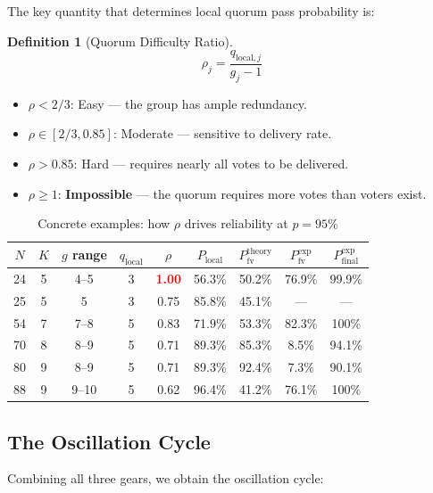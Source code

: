 \documentclass[12pt,a4paper]{article}
\newtheorem{definition}{Definition}
\begin{document}
The key quantity that determines local quorum pass probability is:

\begin{definition}[Quorum Difficulty Ratio]
\begin{equation}
  \rho_j = \frac{q_{\text{local},j}}{g_j - 1}
  \label{eq:rho}
\end{equation}
\end{definition}

\begin{itemize}
  \item $\rho < 2/3$: Easy --- the group has ample redundancy.
  \item $\rho \in [2/3, 0.85]$: Moderate --- sensitive to delivery rate.
  \item $\rho > 0.85$: Hard --- requires nearly all votes to be delivered.
  \item $\rho \geq 1$: \textbf{Impossible} --- the quorum requires more votes than voters exist.
\end{itemize}

\begin{table}[H]
\centering
\caption{Concrete examples: how $\rho$ drives reliability at $p = 95\%$}
\begin{tabular}{ccccccccc}
\toprule
$N$ & $K$ & $g$ range & $q_{\text{local}}$ & $\rho$ & $P_{\text{local}}$ & $P_{\text{fv}}^{\text{theory}}$ & $P_{\text{fv}}^{\text{exp}}$ & $P_{\text{final}}^{\text{exp}}$ \\
\midrule
24 & 5 & 4--5 & 3 & \textcolor{red}{\textbf{1.00}} & 56.3\% & 50.2\% & 76.9\% & 99.9\% \\
25 & 5 & 5 & 3 & 0.75 & 85.8\% & 45.1\% & --- & --- \\
54 & 7 & 7--8 & 5 & 0.83 & 71.9\% & 53.3\% & 82.3\% & 100\% \\
70 & 8 & 8--9 & 5 & 0.71 & 89.3\% & 85.3\% & 8.5\% & 94.1\% \\
80 & 9 & 8--9 & 5 & 0.71 & 89.3\% & 92.4\% & 7.3\% & 90.1\% \\
88 & 9 & 9--10 & 5 & 0.62 & 96.4\% & 41.2\% & 76.1\% & 100\% \\
\bottomrule
\end{tabular}
\end{table}

\subsection{The Oscillation Cycle}

Combining all three gears, we obtain the oscillation cycle:
\end{document}
